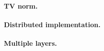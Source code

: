 \documentclass[a4paper,12pt,twoside]{report}
\begin{document}
\paragraph{TV norm.}

\paragraph{Distributed implementation.}

\paragraph{Multiple layers.}



\end{document}
